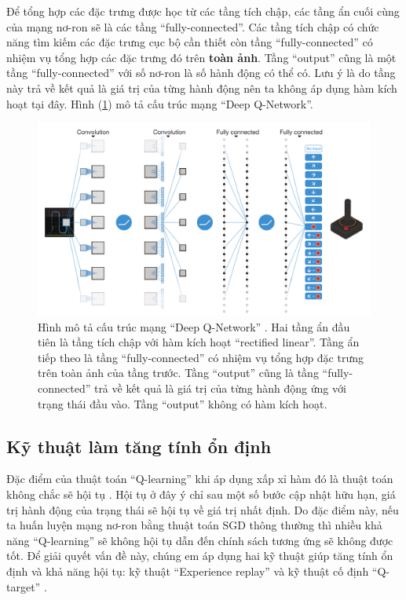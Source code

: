 	Để tổng hợp các đặc trưng được học từ các tầng tích chập, các tầng ẩn cuối cùng của mạng nơ-ron sẽ là các tầng ``fully-connected''.
	Các tầng tích chập có chức năng tìm kiếm các đặc trưng cục bộ cần thiết còn tầng ``fully-connected'' có nhiệm vụ tổng hợp các đặc trưng đó trên \textbf{toàn ảnh}.
	Tầng ``output'' cũng là một tầng ``fully-connected'' với số nơ-ron là số hành động có thể có.
	Lưu ý là do tầng này trả về kết quả là giá trị của từng hành động nên ta không áp dụng hàm kích hoạt tại đây.
	Hình (\ref{fig_dqn_nature}) mô tả cấu trúc mạng ``Deep Q-Network''.
	\begin{figure}
		\centering
		\includegraphics[width=\textwidth]{dqn}
		\caption[Cấu trúc mạng ``Deep Q-Network'']{Hình mô tả cấu trúc mạng ``Deep Q-Network'' \cite{mnihdqn2015}.
		Hai tầng ẩn đầu tiên là tầng tích chập với hàm kích hoạt ``rectified linear''.
		Tầng ẩn tiếp theo là tầng ``fully-connected'' có nhiệm vụ tổng hợp đặc trưng trên toàn ảnh của tầng trước.
		Tầng ``output'' cũng là tầng ``fully-connected'' trả về kết quả là giá trị của từng hành động ứng với trạng thái đầu vào.
		Tầng ``output'' không có hàm kích hoạt.}
		\label{fig_dqn_nature}
	\end{figure}

\subsection{Kỹ thuật làm tăng tính ổn định}
	Đặc điểm của thuật toán ``Q-learning'' khi áp dụng xấp xỉ hàm đó là thuật toán không chắc sẽ hội tụ \cite{sutton1998introduction}.
	Hội tụ ở đây ý chỉ sau một số bước cập nhật hữu hạn, giá trị hành động của trạng thái sẽ hội tụ về giá trị nhất định.
	Do đặc điểm này, nếu ta huấn luyện mạng nơ-ron bằng thuật toán SGD thông thường thì nhiều khả năng ``Q-learning'' sẽ không hội tụ dẫn đến chính sách tương ứng sẽ không được tốt.
	Để giải quyết vấn đề này, chúng em áp dụng hai kỹ thuật giúp tăng tính ổn định và khả năng hội tụ: kỹ thuật ``Experience replay'' \cite{lin1993reinforcement} và kỹ thuật cố định ``Q-target'' \cite{mnih2013playing}.
	
